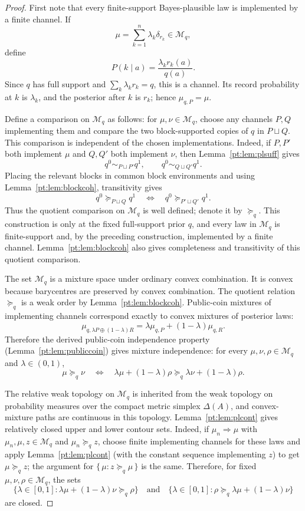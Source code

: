 \documentclass[11pt,a4paper]{article}
\theoremstyle{definition}
\newcommand{\1}{\mathbf 1}
\begin{document}
\begin{proof}
First note that every finite-support Bayes-plausible law is implemented by a finite channel.  If
\[
\mu=\sum_{k=1}^n\lambda_k\delta_{r_k}\in\mathcal M_q,
\]
define
\[
P(k\mid a)=\frac{\lambda_k r_k(a)}{q(a)}.
\]
Since $q$ has full support and $\sum_k\lambda_k r_k=q$, this is a channel.  Its record probability at $k$ is
$\lambda_k$, and the posterior after $k$ is $r_k$; hence $\mu_{q,P}=\mu$.

Define a comparison on $\mathcal M_q$ as follows: for $\mu,\nu\in\mathcal M_q$, choose any channels $P,Q$ implementing
them and compare the two block-supported copies of $q$ in $P\sqcup Q$.  This comparison is independent of the chosen
implementations.  Indeed, if $P,P'$ both implement $\mu$ and $Q,Q'$ both implement $\nu$, then
Lemma~\ref{pt:lem:plsuff} gives
\[
q^0\sim_{P\sqcup P'}q^1,
\qquad
q^0\sim_{Q\sqcup Q'}q^1.
\]
Placing the relevant blocks in common block environments and using Lemma~\ref{pt:lem:blockcoh}, transitivity gives
\[
q^0\succeq_{P\sqcup Q}q^1
\quad\Longleftrightarrow\quad
q^0\succeq_{P'\sqcup Q'}q^1.
\]
Thus the quotient comparison on $\mathcal M_q$ is well defined; denote it by $\succeq_q$.  This construction is only at
the fixed full-support prior $q$, and every law in $\mathcal M_q$ is finite-support and, by the preceding construction,
implemented by a finite channel.  Lemma~\ref{pt:lem:blockcoh} also gives completeness and transitivity of this quotient
comparison.

The set $\mathcal M_q$ is a mixture space under ordinary convex combination.  It is convex because barycentres are
preserved by convex combination.  The quotient relation $\succeq_q$ is a weak order by Lemma~\ref{pt:lem:blockcoh}.
Public-coin mixtures of implementing channels correspond exactly to convex mixtures of posterior laws:
\[
\mu_{q,\lambda P\oplus(1-\lambda)R}
=
\lambda\mu_{q,P}+(1-\lambda)\mu_{q,R}.
\]
Therefore the derived public-coin independence property (Lemma~\ref{pt:lem:publiccoin}) gives mixture independence: for every $\mu,\nu,\rho\in\mathcal M_q$ and
$\lambda\in(0,1)$,
\[
\mu\succeq_q\nu
\quad\Longleftrightarrow\quad
\lambda\mu+(1-\lambda)\rho
\succeq_q
\lambda\nu+(1-\lambda)\rho.
\]

The relative weak topology on $\mathcal M_q$ is inherited from the weak topology on probability measures over the compact
metric simplex $\Delta(A)$, and convex-mixture paths are continuous in this topology.  Lemma~\ref{pt:lem:plcont} gives
relatively closed upper and lower contour sets.  Indeed, if
$\mu_n\Rightarrow\mu$ with $\mu_n,\mu,z\in\mathcal M_q$ and $\mu_n\succeq_q z$, choose finite implementing channels for
these laws and apply Lemma~\ref{pt:lem:plcont} (with the constant sequence implementing $z$) to get $\mu\succeq_q z$; the
argument for $\{\,\mu:z\succeq_q\mu\,\}$ is the
same.  Therefore, for fixed $\mu,\nu,\rho\in\mathcal M_q$, the sets
\[
\{\lambda\in[0,1]:\lambda\mu+(1-\lambda)\nu\succeq_q\rho\}
\quad\text{and}\quad
\{\lambda\in[0,1]:\rho\succeq_q\lambda\mu+(1-\lambda)\nu\}
\]
are closed.


\end{proof}
\end{document}
